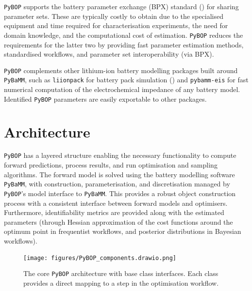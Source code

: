 \documentclass[
]{article}
\begin{document}
\texttt{PyBOP} supports the battery parameter exchange (BPX) standard
() for sharing parameter
sets. These are typically costly to obtain due to the specialised
equipment and time required for characterisation experiments, the need
for domain knowledge, and the computational cost of estimation.
\texttt{PyBOP} reduces the requirements for the latter two by providing
fast parameter estimation methods, standardised workflows, and parameter
set interoperability (via BPX).

\texttt{PyBOP} complements other lithium-ion battery modelling packages
built around \texttt{PyBaMM}, such as \texttt{liionpack} for battery
pack simulation () and
\texttt{pybamm-eis} for fast numerical computation of the
electrochemical impedance of any battery model. Identified
\texttt{PyBOP} parameters are easily exportable to other packages.

\section{Architecture}\label{architecture}

\texttt{PyBOP} has a layered structure enabling the necessary
functionality to compute forward predictions, process results, and run
optimisation and sampling algorithms. The forward model is solved using
the battery modelling software \texttt{PyBaMM}, with construction,
parameterisation, and discretisation managed by \texttt{PyBOP}'s model
interface to \texttt{PyBaMM}. This provides a robust object construction
process with a consistent interface between forward models and
optimisers. Furthermore, identifiability metrics are provided along with
the estimated parameters (through Hessian approximation of the cost
functions around the optimum point in frequentist workflows, and
posterior distributions in Bayesian workflows).

\begin{figure}
\centering
\texttt{[image: figures/PyBOP\_components.drawio.png]}
\caption{The core \texttt{PyBOP} architecture with base class
interfaces. Each class provides a direct mapping to a step in the
optimisation workflow. \label{fig:classes}}
\end{figure}
\end{document}
